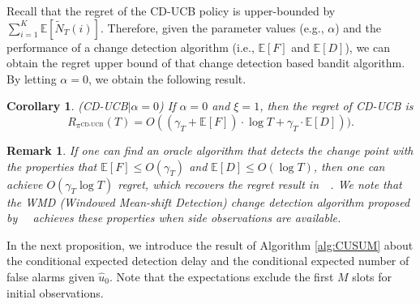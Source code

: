 \documentclass[letterpaper]{article} %
\newtheorem{corollary}{Corollary}
\newtheorem{remark}{Remark}
\newcommand{\blue}{}
\begin{document}
Recall that the regret of the CD-UCB policy is upper-bounded by
$\sum_{i=1}^K\mathbb{E}[\tilde{N}_T(i)]$. 
{\blue Therefore, given the parameter values (e.g., $\alpha$) and
 the performance of a change detection algorithm (i.e.,
 $\mathbb{E}[F]$ and $\mathbb{E}[D]$),
we can obtain the regret upper bound of that change detection based
bandit algorithm.}
{\blue By letting $\alpha=0$, we obtain the following result.} 

\begin{corollary}\label{thm:0CD-UCB}
\emph{(CD-UCB$|\alpha=0$)} If $\alpha=0$ and $\xi=1$, then the regret of CD-UCB is
\begin{equation}
R_{\pi^{\text{CD-UCB}}}(T)=O((\gamma_T+\mathbb{E}[F])\cdot\log T+\gamma_T\cdot\mathbb{E}[D])).
\end{equation}
\end{corollary}
\begin{remark}
If one can find an oracle algorithm that detects the change point with
the properties that $\mathbb{E}[F]\leq O(\gamma_T)$ and
$\mathbb{E}[D]\leq O(\log T)$, then one can achieve $O(\gamma_T \log
T)$ regret, which recovers the regret result
in~\citeauthor{yu2009piecewise}~. We note that the WMD (Windowed Mean-shift Detection) change detection algorithm proposed by~\citeauthor{yu2009piecewise}~ achieves these properties when side observations are available.
\end{remark}
In the next proposition, we introduce the result of Algorithm
\ref{alg:CUSUM} about the conditional expected detection delay and the
conditional expected number of false alarms given $\hat{u}_0$. Note
that the expectations exclude the first $M$ slots for initial observations.
\end{document}
